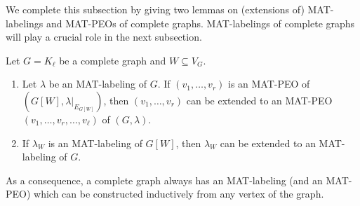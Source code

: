 We complete this subsection by giving two lemmas on (extensions of) MAT-labelings and MAT-PEOs of complete graphs. 
MAT-labelings of complete graphs will play a crucial role in the next subsection. 

\begin{lemma}\label{MAT-L-PEO of complete graph}
Let $ G = K_{\ell} $ be a complete graph and $ W \subseteq V_{G} $. 
\begin{enumerate}[(1)]
\item\label{MAT-L-PEO of complete graph 1} 
Let $ \lambda $ be an MAT-labeling of $ G$. If $ (v_{1}, \dots, v_{r}) $ is an MAT-PEO  of $ (G[W], \lambda|_{E_{G[W]}}) $, then $ (v_{1}, \dots, v_{r}) $ can be extended to an MAT-PEO $ (v_{1}, \dots, v_{r}, \dots, v_{\ell}) $ of $ (G,\lambda) $. 
\item\label{MAT-L-PEO of complete graph 2} 

If $ \lambda_{W} $ is an MAT-labeling of $ G[W] $, then $ \lambda_{W} $ can be extended to an MAT-labeling of $ G $. 

\end{enumerate}
As a consequence, a complete graph always has an MAT-labeling (and an MAT-PEO) which can be constructed inductively from any vertex of the graph.
\end{lemma}

